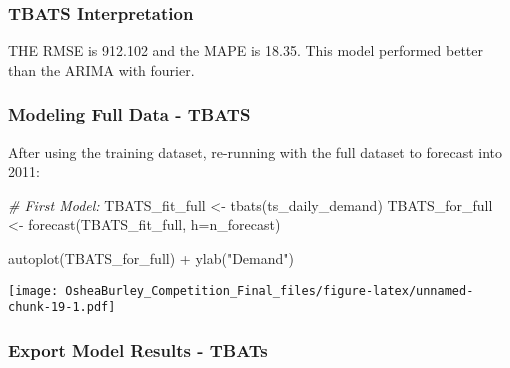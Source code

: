 \documentclass[
]{article}
\newenvironment{Shaded}{\begin{snugshade}}{\end{snugshade}}
\newcommand{\AttributeTok}[1]{\textcolor[rgb]{0.77,0.63,0.00}{#1}}
\newcommand{\CommentTok}[1]{\textcolor[rgb]{0.56,0.35,0.01}{\textit{#1}}}
\newcommand{\FunctionTok}[1]{\textcolor[rgb]{0.00,0.00,0.00}{#1}}
\newcommand{\NormalTok}[1]{#1}
\newcommand{\OtherTok}[1]{\textcolor[rgb]{0.56,0.35,0.01}{#1}}
\newcommand{\SpecialCharTok}[1]{\textcolor[rgb]{0.00,0.00,0.00}{#1}}
\newcommand{\StringTok}[1]{\textcolor[rgb]{0.31,0.60,0.02}{#1}}
\begin{document}
\begin{Shaded}
\end{Shaded}

\hypertarget{tbats-interpretation}{%
\subsubsection{TBATS Interpretation}\label{tbats-interpretation}}

THE RMSE is 912.102 and the MAPE is 18.35. This model performed better
than the ARIMA with fourier.

\hypertarget{modeling-full-data---tbats}{%
\subsubsection{Modeling Full Data -
TBATS}\label{modeling-full-data---tbats}}

After using the training dataset, re-running with the full dataset to
forecast into 2011:

\begin{Shaded}
\begin{Highlighting}[]
\CommentTok{\# First Model: }
\NormalTok{TBATS\_fit\_full }\OtherTok{\textless{}{-}} \FunctionTok{tbats}\NormalTok{(ts\_daily\_demand)}
\NormalTok{TBATS\_for\_full }\OtherTok{\textless{}{-}} \FunctionTok{forecast}\NormalTok{(TBATS\_fit\_full, }\AttributeTok{h=}\NormalTok{n\_forecast)}

\FunctionTok{autoplot}\NormalTok{(TBATS\_for\_full) }\SpecialCharTok{+} \FunctionTok{ylab}\NormalTok{(}\StringTok{"Demand"}\NormalTok{)}
\end{Highlighting}
\end{Shaded}

\texttt{[image: OsheaBurley\_Competition\_Final\_files/figure-latex/unnamed-chunk-19-1.pdf]}

\hypertarget{export-model-results---tbats}{%
\subsubsection{Export Model Results -
TBATs}\label{export-model-results---tbats}}

\begin{Shaded}
\end{Shaded}
\end{document}
